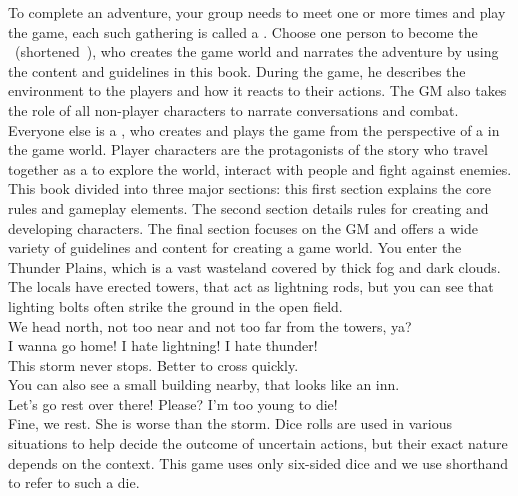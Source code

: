 To complete an adventure, your group needs to meet one or more times and play the game, each such gathering is called a .
%
\ofpar
%
Choose one person to become the ~(shortened~), who creates the game world and narrates the adventure by using the content and guidelines in this book.
During the game, he describes the environment to the players and how it reacts to their actions. 
The GM also takes the role of all non-player characters to narrate conversations and combat. 
Everyone else is a , who creates and plays the game from the perspective of a  in the game world.
Player characters are the protagonists of the story who travel together as a  to explore the world, interact with people and fight against enemies. 
This book divided into three major sections: this first section explains the core rules and gameplay elements.
The second section details rules for creating and developing characters.
The final section focuses on the GM and offers a wide variety of guidelines and content for creating a game world. 
%
\vfill
%
{
	\newcommand{\nl}{\vspace{0.2cm}\\}
	 You enter the Thunder Plains, which is a vast wasteland covered by thick fog and dark clouds.
	The locals have erected towers, that act as lightning rods, but you can see that lighting bolts often strike the ground in the open field.\nl
	 We head north, not too near and not too far from the towers, ya?\nl
	 I wanna go home! I hate lightning! I hate thunder!\nl
	 This storm never stops. Better to cross quickly.\nl
	 You can also see a small building nearby, that looks like an inn.\nl
	 Let’s go rest over there! Please? I'm too young to die!\nl
	 Fine, we rest. She is worse than the storm.
}
%
\vfill
%
Dice rolls are used in various situations to help decide the outcome of uncertain actions, but their exact nature depends on the context. 
This game uses only six-sided dice and we use  shorthand to refer to such a die.
